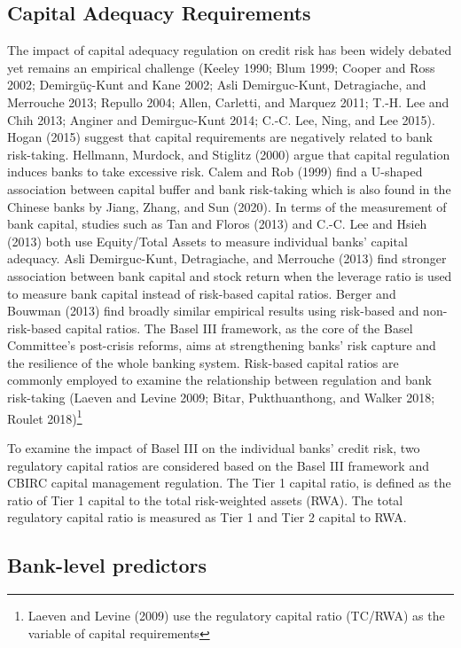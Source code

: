 \documentclass{article}
\begin{document}
\hypertarget{capital-adequacy-requirements}{%
\subsection{Capital Adequacy
Requirements}\label{capital-adequacy-requirements}}

The impact of capital adequacy regulation on credit risk has been widely
debated yet remains an empirical challenge (Keeley 1990; Blum 1999;
Cooper and Ross 2002; Demirgüç-Kunt and Kane 2002; Asli Demirguc-Kunt,
Detragiache, and Merrouche 2013; Repullo 2004; Allen, Carletti, and
Marquez 2011; T.-H. Lee and Chih 2013; Anginer and Demirguc-Kunt 2014;
C.-C. Lee, Ning, and Lee 2015). Hogan (2015) suggest that capital
requirements are negatively related to bank risk-taking. Hellmann,
Murdock, and Stiglitz (2000) argue that capital regulation induces banks
to take excessive risk. Calem and Rob (1999) find a U-shaped association
between capital buffer and bank risk-taking which is also found in the
Chinese banks by Jiang, Zhang, and Sun (2020). In terms of the
measurement of bank capital, studies such as Tan and Floros (2013) and
C.-C. Lee and Hsieh (2013) both use Equity/Total Assets to measure
individual banks' capital adequacy. Asli Demirguc-Kunt, Detragiache, and
Merrouche (2013) find stronger association between bank capital and
stock return when the leverage ratio is used to measure bank capital
instead of risk-based capital ratios. Berger and Bouwman (2013) find
broadly similar empirical results using risk-based and non-risk-based
capital ratios. The Basel III framework, as the core of the Basel
Committee's post-crisis reforms, aims at strengthening banks' risk
capture and the resilience of the whole banking system. Risk-based
capital ratios are commonly employed to examine the relationship between
regulation and bank risk-taking (Laeven and Levine 2009; Bitar,
Pukthuanthong, and Walker 2018; Roulet 2018)\footnote{Laeven and Levine
  (2009) use the regulatory capital ratio (TC/RWA) as the variable of
  capital requirements}

To examine the impact of Basel III on the individual banks' credit risk,
two regulatory capital ratios are considered based on the Basel III
framework and CBIRC capital management regulation. The Tier 1 capital
ratio, is defined as the ratio of Tier 1 capital to the total
risk-weighted assets (RWA). The total regulatory capital ratio is
measured as Tier 1 and Tier 2 capital to RWA.

\hypertarget{bank-level-predictors}{%
\subsection{Bank-level predictors}\label{bank-level-predictors}}
\end{document}
